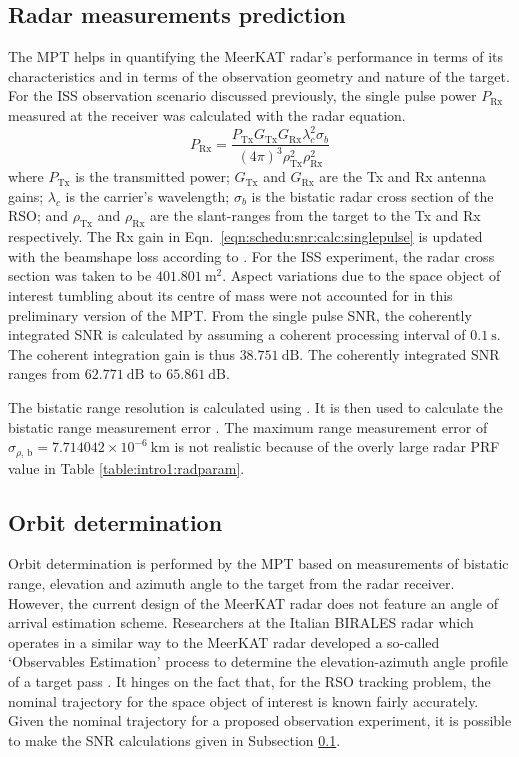 \documentclass[conference]{IEEEtran}
\begin{document}
\subsection{Radar measurements prediction} \label{subsection:rad}
The MPT helps in quantifying the MeerKAT radar's performance in terms of its characteristics and in terms of the observation geometry and nature of the target. For the ISS observation scenario discussed previously, the single pulse power $P_\text{Rx}$ measured at the receiver was calculated with the radar equation.
\begin{equation}
P_\text{Rx} = \frac{P_\text{Tx}G_\text{Tx}G_\text{Rx}\lambda_c^2 \sigma_b}{(4\pi)^3\rho_\text{Tx}^2 \rho_\text{Rx}^2}
\label{eqn:schedu:snr:calc:singlepulse}
\end{equation}
where $P_\text{Tx}$ is the transmitted power; $G_\text{Tx}$ and $G_\text{Rx}$ are the Tx and Rx antenna gains; $\lambda_c$ is the carrier's wavelength; $\sigma_b$ is the bistatic radar cross section of the RSO; and $\rho_\text{Tx}$ and $\rho_\text{Rx}$ are the slant-ranges from the target to the Tx and Rx respectively. The Rx gain in Eqn.~\ref{eqn:schedu:snr:calc:singlepulse} is updated with the beamshape loss according to \cite[Eqn.~6]{morselli2015orbit}. For the ISS experiment, the radar cross section was taken to be $401.801~\mathrm{m}^2$. Aspect variations due to the space object of interest tumbling about its centre of mass were not accounted for in this preliminary version of the MPT. From the single pulse SNR, the coherently integrated SNR is calculated by assuming a coherent processing interval of $0.1~\mathrm{s}$. The coherent integration gain is thus $38.751~\mathrm{dB}$. The coherently integrated SNR ranges from $62.771~\mathrm{dB}$ to $65.861~\mathrm{dB}$.

The bistatic range resolution is calculated using \cite[Eqn.~11.44]{cherniakov2008bistatic}. It is then used to calculate the bistatic range measurement error \cite{curry2005radar}. The maximum range measurement error of $\sigma_{\rho \text{, b}}=7.714042 \times 10^{-6}~\mathrm{km}$ is not realistic because of the overly large radar PRF value in Table \ref{table:intro1:radparam}.

\subsection{Orbit determination}
Orbit determination is performed by the MPT based on measurements of bistatic range, elevation and azimuth angle to the target from the radar receiver. However, the current design of the MeerKAT radar does not feature an angle of arrival estimation scheme. Researchers at the Italian BIRALES radar which operates in a similar way to the MeerKAT radar developed a so-called `Observables Estimation' process to determine the elevation-azimuth angle profile of a target pass \cite{surrey814139}. It hinges on the fact that, for the RSO tracking problem, the nominal trajectory for the space object of interest is known fairly accurately. Given the nominal trajectory for a proposed observation experiment, it is possible to make the SNR calculations given in Subsection \ref{subsection:rad}.
\end{document}
